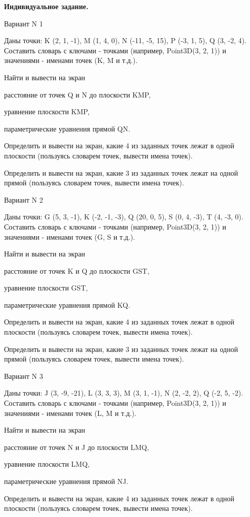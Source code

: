 \documentclass[11pt]{report}
\begin{document}
\pagestyle{empty}

{\bf Индивидуальное задание.}

Вариант N 1

Даны точки: K (2, 1, -1), M (1, 4, 0), N (-11, -5, 15), P (-3, 1, 5), Q (3, -2, 4).
Составить словарь с ключами - точками (например, Point3D(3, 2, 1)) и значениями - именами точек (K, M и т.д.).

 
Найти и вывести на экран


расстояние от точек Q и N до плоскости KMP,

 
уравнение плоскости KMP,

 
параметрические уравнения прямой QN.


Определить и вывести на экран, какие 4 из заданных точек лежат в одной плоскости (пользуясь словарем точек, вывести имена точек).


Определить и вывести на экран, какие 3 из заданных точек лежат на одной прямой (пользуясь словарем точек, вывести имена точек).

Вариант N 2

Даны точки: G (5, 3, -1), K (-2, -1, -3), Q (20, 0, 5), S (0, 4, -3), T (4, -3, 0).
Составить словарь с ключами - точками (например, Point3D(3, 2, 1)) и значениями - именами точек (G, S и т.д.).

 
Найти и вывести на экран


расстояние от точек K и Q до плоскости GST,

 
уравнение плоскости GST,

 
параметрические уравнения прямой KQ.


Определить и вывести на экран, какие 4 из заданных точек лежат в одной плоскости (пользуясь словарем точек, вывести имена точек).


Определить и вывести на экран, какие 3 из заданных точек лежат на одной прямой (пользуясь словарем точек, вывести имена точек).

Вариант N 3

Даны точки: J (3, -9, -21), L (3, 3, 3), M (3, 1, -1), N (2, -2, 2), Q (-2, 5, -2).
Составить словарь с ключами - точками (например, Point3D(3, 2, 1)) и значениями - именами точек (L, M и т.д.).

 
Найти и вывести на экран


расстояние от точек N и J до плоскости LMQ,

 
уравнение плоскости LMQ,

 
параметрические уравнения прямой NJ.


Определить и вывести на экран, какие 4 из заданных точек лежат в одной плоскости (пользуясь словарем точек, вывести имена точек).
\end{document}
